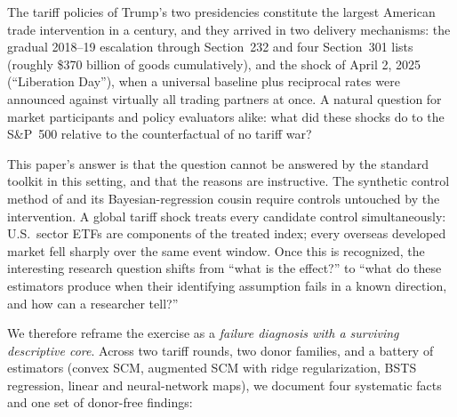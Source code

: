 \documentclass[11pt,a4paper]{article}
\begin{document}
The tariff policies of Trump's two presidencies constitute the largest
American trade intervention in a century, and they arrived in two delivery
mechanisms: the gradual 2018--19 escalation through Section~232 and four
Section~301 lists (roughly \$370 billion of goods cumulatively), and the
shock of April 2, 2025 (``Liberation Day''), when a universal baseline plus
reciprocal rates were announced against virtually all trading partners at
once. A natural question for market participants and policy evaluators
alike: what did these shocks do to the S\&P~500 relative to the
counterfactual of no tariff war?

This paper's answer is that the question cannot be answered by the standard
toolkit in this setting, and that the reasons are instructive. The synthetic
control method of \citet{abadie2010} and its Bayesian-regression cousin
\citep{brodersen2015} require controls untouched by the intervention. A
global tariff shock treats every candidate control simultaneously: U.S.\
sector ETFs are components of the treated index; every overseas developed
market fell sharply over the same event window. Once this is recognized,
the interesting research question shifts from ``what is the effect?'' to
``what do these estimators produce when their identifying assumption fails
in a known direction, and how can a researcher tell?''

We therefore reframe the exercise as a \emph{failure diagnosis with a
surviving descriptive core}. Across two tariff rounds, two donor families,
and a battery of estimators (convex SCM, augmented SCM with ridge
regularization, BSTS regression, linear and neural-network maps), we
document four systematic facts and one set of donor-free findings:
\end{document}
